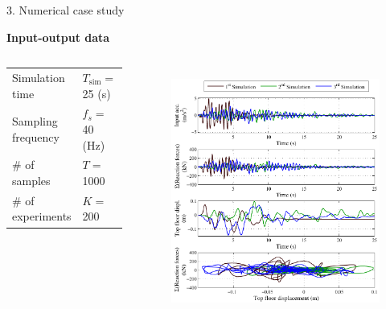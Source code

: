 \documentclass[10pt,xcolor = dvipsnames]{beamer}
\newcommand{\vc}[1]{\vspace*{#1cm}}
\begin{document}
\begin{frame}[t]{3. Numerical case study}

{\small {\bf Input-output data}}

\begin{columns}


\scriptsize\begin{spacing}{1.2} \begin{tabular}{ll}
\hline
Simulation time  & $T_{\text{sim}} = $ 25 (s)\\
Sampling frequency  & $f_s = $ 40 (Hz)\\
\# of samples  & $T =$ 1000\\
\# of experiments  & $K =$ 200\\
\hline
\end{tabular}
\end{spacing}

\vc{-1.4}\begin{figure}
{\includegraphics[width=1.05\textwidth]{SF2D_simulations.pdf}}
\end{figure}
\end{columns}

\end{frame}
\end{document}
